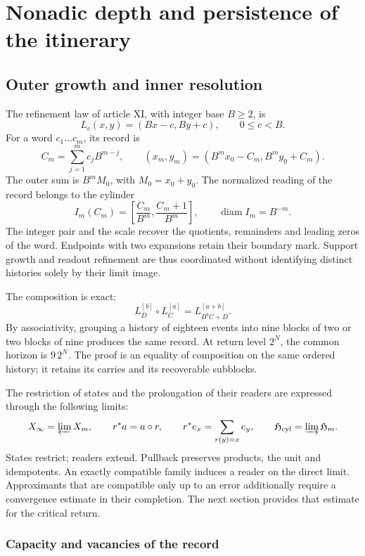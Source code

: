 \section{Nonadic depth and persistence of the itinerary}
\label{hmtfg:fragmento:profundidad-nonadica-y-persistencia-del-itinerario}

\subsection{Outer growth and inner resolution}
\label{hmtfg:prolongacion:2}

The refinement law of article XI, with integer base \(B\ge2\), is
\[
L_c(x,y)=(Bx-c,By+c),\qquad 0\le c<B.
\]
For a word \(c_1\ldots c_m\), its record is
\[
C_m=\sum_{j=1}^m c_jB^{m-j},\qquad
(x_m,y_m)=(B^mx_0-C_m,B^my_0+C_m).
\]
The outer sum is \(B^mM_0\), with \(M_0=x_0+y_0\). The normalized reading of the record belongs to the cylinder
\[
I_m(C_m)=\left[\frac{C_m}{B^m},\frac{C_m+1}{B^m}\right],
\qquad \operatorname{diam}I_m=B^{-m}.
\]
The integer pair and the scale recover the quotients, remainders and leading zeros of the word. Endpoints with two expansions retain their boundary mark. Support growth and readout refinement are thus coordinated without identifying distinct histories solely by their limit image.

The composition is exact:
\[
L_D^{[b]}\circ L_C^{[a]}=L_{B^bC+D}^{[a+b]}.
\]
By associativity, grouping a history of eighteen events into nine blocks of two or two blocks of nine produces the same record. At return level \(2^N\), the common horizon is \(9\,2^N\). The proof is an equality of composition on the same ordered history; it retains its carries and its recoverable subblocks.

The restriction of states and the prolongation of their readers are expressed through the following limits:
\[
X_\infty=\varprojlim X_m,\qquad
r^*a=a\circ r,\qquad
r^*e_x=\sum_{r(y)=x}e_y,
\qquad \mathfrak H_{\rm cyl}=\varinjlim\mathfrak H_m.
\]
States restrict; readers extend. Pullback preserves products, the unit and idempotents. An exactly compatible family induces a reader on the direct limit. Approximants that are compatible only up to an error additionally require a convergence estimate in their completion. The next section provides that estimate for the critical return.

\subsubsection{Capacity and vacancies of the record}

